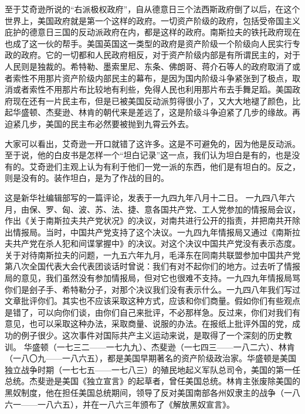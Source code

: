 至于艾奇逊所说的“右派极权政府”，自从德意日三个法西斯政府倒了以后，在这个世界上，美国政府就是第一个这样的政府。一切资产阶级的政府，包括受帝国主义庇护的德意日三国的反动派政府在内，都是这样的政府。南斯拉夫的铁托政府现在也成了这一伙的帮手。美国英国这一类型的政府是资产阶级一个阶级向人民实行专政的政府。它的一切都和人民政府相反，对于资产阶级内部是有所谓民主的，对于人民则是独裁的。希特勒、墨索里尼、东条、佛朗哥、蒋介石等人的政府取消了或者索性不用那片资产阶级内部民主的幕布，是因为国内阶级斗争紧张到了极点，取消或者索性不用那片布比较地有利些，免得人民也利用那片布去手舞足蹈。美国政府现在还有一片民主布，但是已被美国反动派剪得很小了，又大大地褪了颜色，比起华盛顿、杰斐逊、林肯的朝代来是差远了，这是阶级斗争迫紧了几步的缘故。再迫紧几步，美国的民主布必然要被抛到九霄云外去。

大家可以看出，艾奇逊一开口就错了这许多。这是不可避免的，因为他是反动派。至于说，他的白皮书是怎样一个“坦白记录”这一点，我们认为坦白是有的，也是没有的。艾奇逊们主观上认为有利于他们一党一派的东西，他们是有坦白的。反之，则是没有的。装作坦白，是为了作战的目的。


\begin{maonote}
这是新华社编辑部写的一篇评论，发表于一九四九年八月十二日。
一九四八年六月，由保、罗、匈、波、苏、法、捷、意各国共产党、工人党参加的情报局会议，作出《关于南斯拉夫共产党状况》的决议，对南共进行公开的指责，并把南共开除出情报局。当时，中国共产党支持了这个决议。一九四九年情报局又通过《南斯拉夫共产党在杀人犯和间谍掌握中》的决议。对这个决议中国共产党没有表示态度。关于对待南斯拉夫的问题，一九五六年九月，毛泽东在同南共联盟参加中国共产党第八次全国代表大会代表团谈话时曾说：我们有对不起你们的地方。过去听了情报局的意见，我们虽然没有参加情报局，但对它也很难不支持。一九四九年情报局骂你们是刽子手、希特勒分子，对那个决议我们没有表示什么。一九四八年我们写过文章批评你们。其实也不应该采取这种方式，应该和你们商量。假如你们有些观点是错了，可以向你们谈，由你们自己来批评，不必那样急。反过来，你们对我们有意见，也可以采取这种办法，采取商量、说服的办法。在报纸上批评外国的党，成功的例子很少。这次事件对国际共产主义运动来说，是取得了一个深刻的历史教训。
华盛顿（一七三二——一七九九）、杰斐逊（一七四三——一八二六）、林肯（一八〇九——一八六五），都是美国早期著名的资产阶级政治家。华盛顿是美国独立战争时期（一七七五——一七八三）的殖民地起义军队总司令，美国的第一任总统。杰斐逊是美国《独立宣言》的起草者，曾任美国总统。林肯主张废除美国的黑奴制度，他在担任美国总统期间，领导了反对美国南部各州奴隶主的战争（一八六一——一八六五），并在一八六三年颁布了《解放黑奴宣言》。
\end{maonote}
